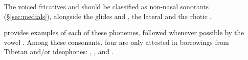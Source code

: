 \begin{table}[h]
	\caption{Consonantal phonemes}  \label{tab:consonants}   
\end{table}


The voiced fricatives  and  should be classified as non-nasal sonorants (§\ref{sec:medials}), alongside the glides  and , the lateral  and the rhotic .

  provides examples of each of these phonemes, followed whenever possible by the vowel .  Among these consonants, four are only attested in borrowings from Tibetan and/or ideophones: , ,  and .


